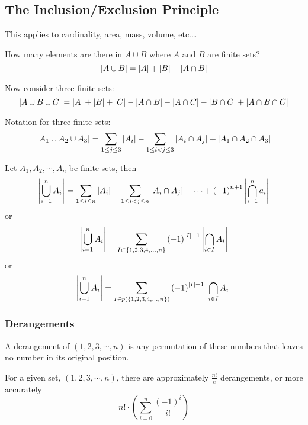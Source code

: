     \subsection{The Inclusion/Exclusion Principle}
    This applies to cardinality, area, mass, volume, etc.\ldots

    How many elements are there in $A \cup B$ where $A$ and $B$ are finite sets?
        \[ \left\lvert A \cup B \right\rvert = \left\lvert A \right\rvert + \left\lvert B \right\rvert - \left\lvert A \cap B \right\rvert \]

    Now consider three finite sets:
        \[ \left\lvert A \cup B \cup C \right\rvert = \left\lvert A \right\rvert + \left\lvert B \right\rvert + \left\lvert C \right\rvert - \left\lvert A \cap B \right\rvert - \left\lvert A \cap C \right\rvert - \left\lvert B \cap C \right\rvert + \left\lvert A \cap B \cap C \right\rvert \]

    Notation for three finite sets:
        \[ \left\lvert A_1 \cup A_2 \cup A_3 \right\rvert = \sum_{1 \le j \le 3} \left\lvert A_i \right\rvert - \sum_{1 \le i < j \le 3} \left\lvert A_i \cap A_j \right\rvert + \left\lvert A_1 \cap A_2 \cap A_3 \right\rvert \]

    \begin{thm}
        Let $A_1, A_2, \cdots, A_n$ be finite sets, then
            \[ \left\lvert \bigcup^n_{i=1} A_i \right\rvert = \sum_{1 \le i \le n} \left\lvert A_i \right\rvert - \sum_{1 \le i < j \le n} \left\lvert A_i \cap A_j \right\rvert + \cdots + {\left( -1 \right)}^{n+1} \left\lvert \bigcap^n_{i=1} a_i \right\rvert \]
        or
            \[ \left\lvert \bigcup^n_{i=1} A_i \right\rvert = \sum_{I \subset \{1, 2, 3, 4, \ldots, n \} } {(-1)}^{\left\lvert I \right\rvert + 1} \left\lvert \bigcap_{i \in I} A_i \right\rvert \]
        or
            \[ \left\lvert \bigcup^n_{i=1} A_i \right\rvert = \sum_{I \in p(\{1, 2, 3, 4, \ldots, n \})} {(-1)}^{\left\lvert I \right\rvert + 1} \left\lvert \bigcap_{i \in I} A_i \right\rvert \]

    \end{thm}

        \subsubsection{Derangements}
        A derangement of $(1, 2, 3, \cdots, n)$ is any permutation of these numbers that leaves no number in its original position.

        For a given set, $(1, 2, 3, \cdots, n)$, there are approximately $\frac{n!}{e}$ derangements, or more accurately
            \[ n! \cdot \left( \sum^n_{i=0} \frac{ {\left( -1 \right)}^i}{i!} \right) \]

